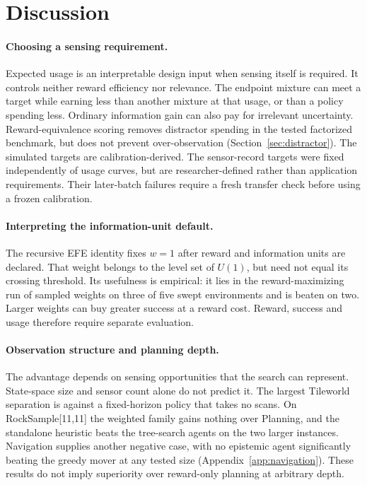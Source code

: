 \documentclass[runningheads]{llncs}
\begin{document}
\section{Discussion}
\label{sec:discussion}

\paragraph{Choosing a sensing requirement.}
Expected usage is an interpretable design input when sensing itself is required. It controls neither reward efficiency nor relevance. The endpoint mixture can meet a target while earning less than another mixture at that usage, or than a policy spending less. Ordinary information gain can also pay for irrelevant uncertainty. Reward-equivalence scoring removes distractor spending in the tested factorized benchmark, but does not prevent over-observation (Section~\ref{sec:distractor}). The simulated targets are calibration-derived. The sensor-record targets were fixed independently of usage curves, but are researcher-defined rather than application requirements. Their later-batch failures require a fresh transfer check before using a frozen calibration.

\paragraph{Interpreting the information-unit default.}
The recursive EFE identity fixes $w=1$ after reward and information units are declared. That weight belongs to the level set of $U(1)$, but need not equal its crossing threshold. Its usefulness is empirical: it lies in the reward-maximizing run of sampled weights on three of five swept environments and is beaten on two. Larger weights can buy greater success at a reward cost. Reward, success and usage therefore require separate evaluation.

\paragraph{Observation structure and planning depth.}
The advantage depends on sensing opportunities that the search can represent. State-space size and sensor count alone do not predict it. The largest Tileworld separation is against a fixed-horizon policy that takes no scans. On RockSample[11,11] the weighted family gains nothing over Planning, and the standalone heuristic beats the tree-search agents on the two larger instances. Navigation supplies another negative case, with no epistemic agent significantly beating the greedy mover at any tested size (Appendix~\ref{app:navigation}). These results do not imply superiority over reward-only planning at arbitrary depth.
\end{document}
